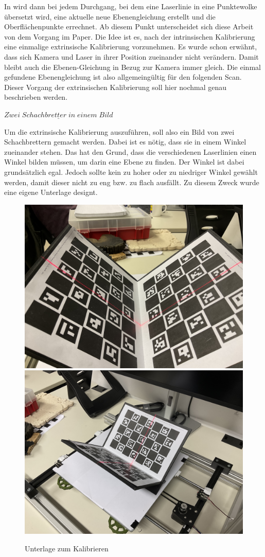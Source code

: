 		In \citep[vgl.][]{baj-per} wird dann bei jedem Durchgang, bei dem eine Laserlinie in eine Punktewolke übersetzt wird, eine aktuelle neue Ebenengleichung erstellt und die Oberflächenpunkte errechnet. Ab diesem Punkt unterscheidet sich diese Arbeit von dem Vorgang im Paper. Die Idee ist es, nach der intrinsischen Kalibrierung eine einmalige extrinsische Kalibrierung vorzunehmen. Es wurde schon erwähnt, dass sich Kamera und Laser in ihrer Position zueinander nicht verändern. Damit bleibt auch die Ebenen-Gleichung in Bezug zur Kamera immer gleich. Die einmal gefundene Ebenengleichung ist also allgemeingültig für den folgenden Scan. Dieser Vorgang der extrinsischen Kalibrierung soll hier nochmal genau beschrieben werden.
		
		$\underline{Zwei \; Schachbretter \; in \; einem \; Bild}$
		
		Um die extrinsische Kalibrierung auszuführen, soll also ein Bild von zwei Schachbrettern gemacht werden. Dabei ist es nötig, dass sie in einem Winkel zueinander stehen. Das hat den Grund, dass die verschiedenen Laserlinien einen Winkel bilden müssen, um darin eine Ebene zu finden. Der Winkel ist dabei grundsätzlich egal. Jedoch sollte kein zu hoher oder zu niedriger Winkel gewählt werden, damit dieser nicht zu eng bzw. zu flach ausfällt. Zu diesem Zweck wurde eine eigene Unterlage designt.
		
		\begin{figure}[h]
			\centering
			\includegraphics[width=0.49\linewidth]{img/hauptteil/ext-calib/pattern_0.jpg}
			\includegraphics[width=0.49\linewidth]{img/hauptteil/ext-calib/pattern_1.jpg}
			\caption{Unterlage zum Kalibrieren}
			\label{fig:ext-calib-pattern}
		\end{figure} 
	
